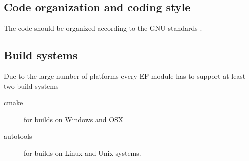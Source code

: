 \documentclass{scrartcl}
\begin{document}
\subsection{Code organization and coding style}

The code should be organized according to the GNU standards
\cite{GNU_STYLE,GNU_MAINTENANCE}.

\subsection{Build systems}

Due to the large number of platforms every EF module has to support at least two
build systems
\begin{description}
    \item[cmake] \cite{CMAKE} for builds on Windows and OSX
    \item[autotools] \cite{AUTOTOOLS} for builds on Linux and Unix systems.
\end{description}



\end{document}
